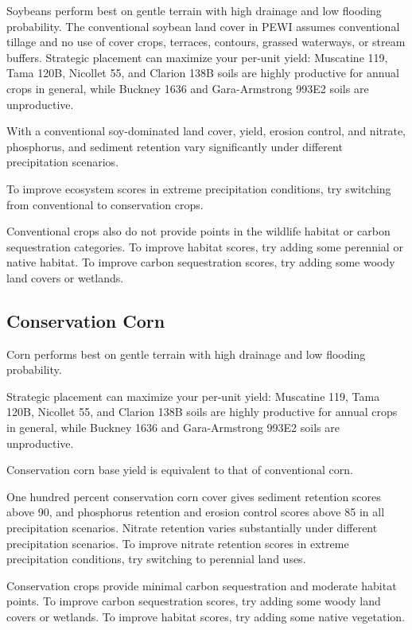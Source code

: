 \documentclass[11pt]{article}
\begin{document}
Soybeans perform best on gentle terrain with high drainage and low flooding probability. The conventional soybean land cover in PEWI assumes conventional tillage and no use of cover crops, terraces, contours, grassed waterways, or stream buffers. 
Strategic placement can maximize your per-unit yield: Muscatine 119, Tama 120B, Nicollet 55, and Clarion 138B soils are highly productive for annual crops in general, while Buckney 1636 and Gara-Armstrong 993E2 soils are unproductive.
 
With a conventional soy-dominated land cover, yield, erosion control, and nitrate, phosphorus, and sediment retention vary significantly under different precipitation scenarios. 

To improve ecosystem scores in extreme precipitation conditions, try switching from conventional to conservation crops.

Conventional crops also do not provide points in the wildlife habitat or carbon sequestration categories. To improve habitat scores, try adding some perennial or native habitat. To improve carbon sequestration scores, try adding some woody land covers or wetlands.

\subsection{Conservation Corn}

Corn performs best on gentle terrain with high drainage and low flooding probability. 

Strategic placement can maximize your per-unit yield: Muscatine 119, Tama 120B, Nicollet 55, and Clarion 138B soils are highly productive for annual crops in general, while Buckney 1636 and Gara-Armstrong 993E2 soils are unproductive.

Conservation corn base yield is equivalent to that of conventional corn.

One hundred percent conservation corn cover gives sediment retention scores above 90, and phosphorus retention and erosion control scores above 85 in all precipitation scenarios. Nitrate retention varies substantially under different precipitation scenarios. To improve nitrate retention scores in extreme precipitation conditions, try switching to perennial land uses.

Conservation crops provide minimal carbon sequestration and moderate habitat points. To improve carbon sequestration scores, try adding some woody land covers or wetlands. To improve habitat scores, try adding some native vegetation.
\end{document}
